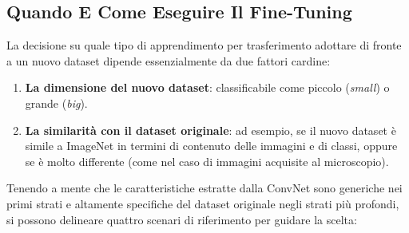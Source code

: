 ﻿\documentclass[11pt, a4paper]{article}
\begin{document}
\subsection{Quando E Come Eseguire Il Fine-Tuning}
La decisione su quale tipo di apprendimento per trasferimento adottare di fronte a un nuovo dataset dipende essenzialmente da due fattori cardine:
\begin{enumerate}
    \item \textbf{La dimensione del nuovo dataset}: classificabile come piccolo (\emph{small}) o grande (\emph{big}).
    \item \textbf{La similarità con il dataset originale}: ad esempio, se il nuovo dataset è simile a ImageNet in termini di contenuto delle immagini e di classi, oppure se è molto differente (come nel caso di immagini acquisite al microscopio).
\end{enumerate}

Tenendo a mente che le caratteristiche estratte dalla ConvNet sono generiche nei primi strati e altamente specifiche del dataset originale negli strati più profondi, si possono delineare quattro scenari di riferimento per guidare la scelta:
\end{document}
